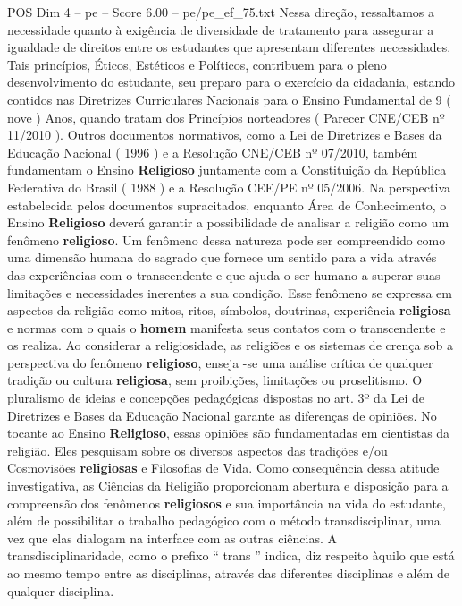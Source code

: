 \begin{textsample}{POS Dim 4 – pe – Score 6.00 – pe/pe\_ef\_75.txt}
Nessa direção, ressaltamos a necessidade quanto à exigência de diversidade de tratamento para assegurar a igualdade de direitos entre os estudantes que apresentam diferentes necessidades.
Tais princípios, Éticos, Estéticos e Políticos, contribuem para o pleno desenvolvimento do estudante, seu preparo para o exercício da cidadania, estando contidos nas Diretrizes Curriculares Nacionais para o Ensino Fundamental de 9 ( nove ) Anos, quando tratam dos Princípios norteadores ( Parecer CNE/CEB nº 11/2010 ).
Outros documentos normativos, como a Lei de Diretrizes e Bases da Educação Nacional ( 1996 ) e a Resolução CNE/CEB nº 07/2010, também fundamentam o Ensino \textbf{Religioso} juntamente com a Constituição da República Federativa do Brasil ( 1988 ) e a Resolução CEE/PE nº 05/2006.
Na perspectiva estabelecida pelos documentos supracitados, enquanto Área de Conhecimento, o Ensino \textbf{Religioso} deverá garantir a possibilidade de analisar a religião como um fenômeno \textbf{religioso}.
Um fenômeno dessa natureza pode ser compreendido como uma dimensão humana do sagrado que fornece um sentido para a vida através das experiências com o transcendente e que ajuda o ser humano a superar suas limitações e necessidades inerentes a sua condição.
Esse fenômeno se expressa em aspectos da religião como mitos, ritos, símbolos, doutrinas, experiência \textbf{religiosa} e normas com o quais o \textbf{homem} manifesta seus contatos com o transcendente e os realiza.
Ao considerar a religiosidade, as religiões e os sistemas de crença sob a perspectiva do fenômeno \textbf{religioso}, enseja -se uma análise crítica de qualquer tradição ou cultura \textbf{religiosa}, sem proibições, limitações ou proselitismo.
O pluralismo de ideias e concepções pedagógicas dispostas no art. 3º da Lei de Diretrizes e Bases da Educação Nacional garante as diferenças de opiniões.
No tocante ao Ensino \textbf{Religioso}, essas opiniões são fundamentadas em cientistas da religião.
Eles pesquisam sobre os diversos aspectos das tradições e/ou Cosmovisões \textbf{religiosas} e Filosofias de Vida.
Como consequência dessa atitude investigativa, as Ciências da Religião proporcionam abertura e disposição para a compreensão dos fenômenos \textbf{religiosos} e sua importância na vida do estudante, além de possibilitar o trabalho pedagógico com o método transdisciplinar, uma vez que elas dialogam na interface com as outras ciências.
A transdisciplinaridade, como o prefixo “ trans ” indica, diz respeito àquilo que está ao mesmo tempo entre as disciplinas, através das diferentes disciplinas e além de qualquer disciplina.

\end{textsample}
